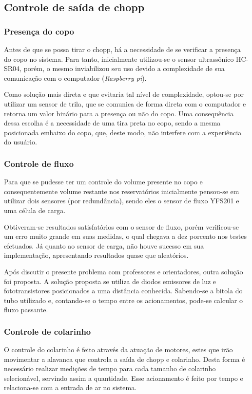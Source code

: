    


\subsection{Controle de saída de chopp}
\subsubsection{Presença do copo}
Antes de que se possa tirar o chopp, há a necessidade de se verificar a presença do copo no sistema. Para tanto, inicialmente utilizou-se o sensor ultrassônico HC-SR04, porém, o mesmo inviabilizou seu uso devido a complexidade de sua comunicação com o computador (\textit{Raspberry pi}).

Como solução mais direta e que evitaria tal nível de complexidade, optou-se por utilizar um sensor de trila, que se comunica de forma direta com o computador e retorna um valor binário para a presença ou não do copo. Uma consequência dessa escolha é a necessidade de uma tira preta no copo, sendo a mesma posicionada embaixo do copo, que, deste modo, não interfere com a experiência do usuário.
\subsubsection{Controle de fluxo}
Para que se pudesse ter um controle do volume presente no copo e consequentemente volume restante nos reservatórios inicialmente pensou-se em utilizar dois sensores (por redundância), sendo eles o sensor de fluxo YFS201 e uma célula de carga.

Obtiveram-se resultados satisfatórios com o sensor de fluxo, porém verificou-se um erro muito grande em suas medidas, o qual chegava a dez porcento nos testes efetuados. Já quanto ao sensor de carga, não houve sucesso em sua implementação, apresentando resultados quase que aleatórios.

Após discutir o presente problema com professores e orientadores, outra solução foi proposta. A solução proposta se utiliza de diodos emissores de luz e fototransistores posicionados a uma distância conhecida. Sabendo-se a bitola do tubo utilizado e, contando-se o tempo entre os acionamentos, pode-se calcular o fluxo passante.  

\subsubsection{Controle de colarinho}

	O controle do colarinho é feito através da atuação de motores, estes que irão movimentar a alavanca que controla a saída de chopp e colarinho. Desta forma é necessário realizar medições de tempo para cada tamanho de colarinho selecionável, servindo assim a quantidade. Esse acionamento é feito por tempo e relaciona-se com a entrada de ar no  sistema.

